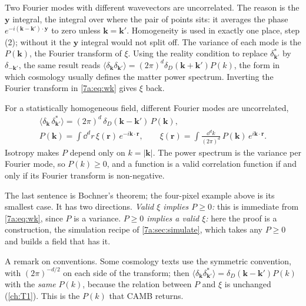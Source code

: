 Two Fourier modes with different wavevectors are uncorrelated. The reason is the
$\bm y$ integral, the integral over where the pair of points sits: it averages
the phase $e^{-i(\bm k-\bm k')\cdot\bm y}$ to zero unless $\bm k=\bm k'$.
Homogeneity is used in exactly one place, step (2); without it the $\bm y$
integral would not split off. The variance of each mode is the  $P(\bm k)$, the Fourier transform of $\xi$. Using the reality
condition to replace $\delta_{\bm k'}^*$ by $\delta_{-\bm k'}$, the same result
reads $\langle\delta_{\bm k}\delta_{\bm k'}\rangle=(2\pi)^d\delta_D(\bm k+\bm k')P(k)$,
the form in which cosmology usually defines the matter power spectrum.
Inverting the Fourier transform in \eqref{7a:eq:wk} gives $\xi$ back.

\begin{keyidea}
For a statistically homogeneous field, different Fourier modes are uncorrelated,
\begin{gather*}
  \langle\delta_{\bm k}\,\delta_{\bm k'}^*\rangle=(2\pi)^d\,\delta_D(\bm k-\bm k')\,P(\bm k),\\
  P(\bm k)=\int\dd^dr\,\xi(\bm r)\,e^{-i\bm k\cdot\bm r},
  \qquad
  \xi(\bm r)=\int\frac{\dd^dk}{(2\pi)^d}\,P(\bm k)\,e^{i\bm k\cdot\bm r}.
\end{gather*}
Isotropy makes $P$ depend only on $k=|\bm k|$. The power spectrum is the
variance per Fourier mode, so $P(k)\ge0$, and a function is a valid correlation
function if and only if its Fourier transform is non-negative.
\end{keyidea}

The last sentence is Bochner's theorem; the four-pixel example above is its
smallest case. It has two directions. \emph{Valid $\xi$ implies $P\ge0$:} this is
immediate from \eqref{7a:eq:wk}, since $P$ is a variance. \emph{$P\ge0$ implies a
valid $\xi$:} here the proof is a construction, the simulation recipe of
\cref{7a:sec:simulate}, which takes any $P\ge0$ and builds a field that has it.

A remark on conventions. Some cosmology texts use the symmetric convention, with
$(2\pi)^{-d/2}$ on each side of the transform; then
$\langle\delta_{\bm k}\delta_{\bm k'}^*\rangle=\delta_D(\bm k-\bm k')P(k)$ with
the \emph{same} $P(k)$, because the relation between $P$ and $\xi$ is unchanged
(\cref{ch:T1}). This is the $P(k)$ that CAMB returns.

